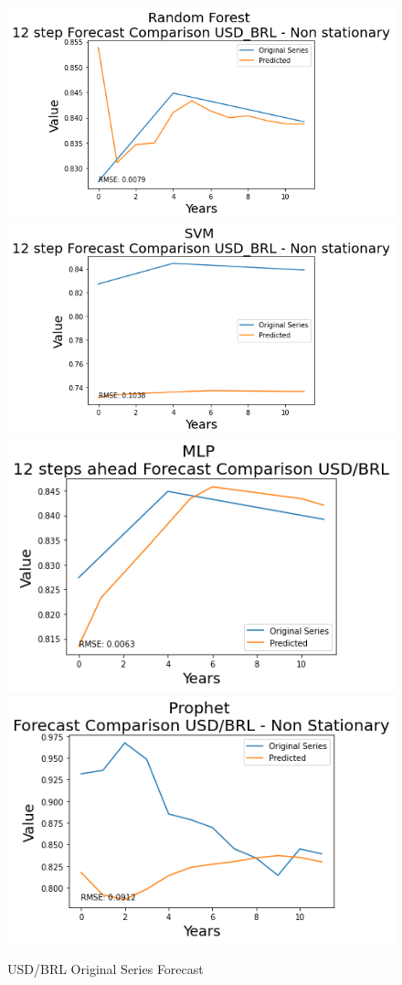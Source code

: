 \documentclass[10pt,twocolumn,letterpaper]{article}
\begin{document}
	\begin{figure}[h]
		\centering
		\includegraphics[width=0.45\linewidth]{../img/RandomForest/usd_brl_for}
		\includegraphics[width=0.45\linewidth]{../img/SVM/usd_brl_for}
		\includegraphics[width=0.45\linewidth]{../img/MLP/usd_brl_for}
		\includegraphics[width=0.45\linewidth]{../img/Prophet/usd_brl_for}
		\caption{USD/BRL Original Series Forecast}
		\label{fig:usd_brlforecast}
	\end{figure}
	
	
	
	
	
	
	
	
	
	
	
\end{document}
